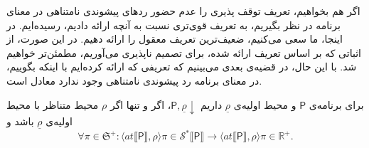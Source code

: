 اگر هم بخواهیم، تعریف توقف پذیری را عدم حضور ردهای پیشوندی نامتناهی در معنای برنامه در نظر بگیریم، به تعریف قوی‌تری نسبت به آنچه ارائه دادیم، رسیده‌ایم. در اینجا، ما سعی می‌کنیم، ضعیف‌ترین تعریف معقول را ارائه دهیم. در این صورت، از اثباتی که بر اساس تعریف ارائه شده، برای تصمیم ناپذیری می‌آوریم، مطمئن‌تر خواهیم شد. با این حال، در قضیه‌ی بعدی می‌بینیم که تعریفی که ارائه کرده‌ایم با اینکه بگوییم، در معنای برنامه رد پیشوندی نامتناهی وجود ندارد معادل است.
\begin{thm}
	برای برنامه‌ی $\mathsf{P}$ و محیط اولیه‌ی $\underline{\rho}$ داریم $\mathsf{P} , \underline{\rho} \downarrow $، اگر و تنها اگر $\rho$ محیط متناظر با محیط اولیه‌ی $\underline{\rho}$ باشد و
	$$\forall \pi \in \mathfrak{S^{+}} : 
	\langle at \llbracket \mathsf{P} \rrbracket , \rho \rangle \pi \in \mathcal{S^*} \llbracket \mathsf{P} \rrbracket \rightarrow
	\langle at \llbracket \mathsf{P} \rrbracket , \rho \rangle \pi \in \mathbb{R^+}.$$
	 
\end{thm}

